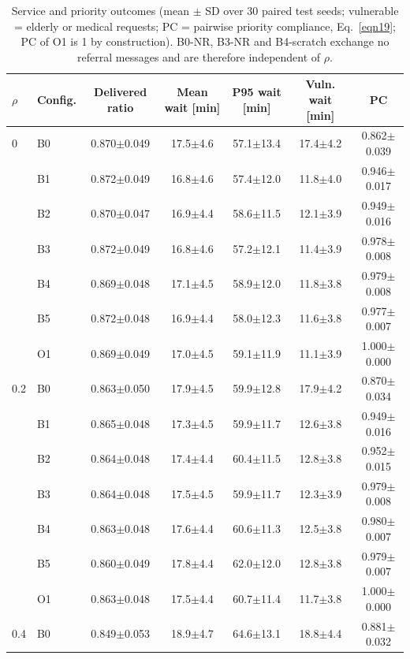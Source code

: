 \begin{table}[!t]
\caption{Service and priority outcomes (mean $\pm$ SD over 30 paired test seeds; vulnerable = elderly or medical requests; PC = pairwise priority compliance, Eq.~\eqref{eqn19}; PC of O1 is 1 by construction). B0-NR, B3-NR and B4-scratch exchange no referral messages and are therefore independent of $\rho$.}
\label{tabres}
\centering\footnotesize
\begin{tabular}{llccccc}
\toprule
$\rho$ & Config. & Delivered ratio & Mean wait [min] & P95 wait [min] & Vuln. wait [min] & PC \\
\midrule
0 & B0 & 0.870$\pm$0.049 & 17.5$\pm$4.6 & 57.1$\pm$13.4 & 17.4$\pm$4.2 & 0.862$\pm$0.039 \\
 & B1 & 0.872$\pm$0.049 & 16.8$\pm$4.6 & 57.4$\pm$12.0 & 11.8$\pm$4.0 & 0.946$\pm$0.017 \\
 & B2 & 0.870$\pm$0.047 & 16.9$\pm$4.4 & 58.6$\pm$11.5 & 12.1$\pm$3.9 & 0.949$\pm$0.016 \\
 & B3 & 0.872$\pm$0.049 & 16.8$\pm$4.6 & 57.2$\pm$12.1 & 11.4$\pm$3.9 & 0.978$\pm$0.008 \\
 & B4 & 0.869$\pm$0.048 & 17.1$\pm$4.5 & 58.9$\pm$12.0 & 11.8$\pm$3.8 & 0.979$\pm$0.008 \\
 & B5 & 0.872$\pm$0.048 & 16.9$\pm$4.4 & 58.0$\pm$12.3 & 11.6$\pm$3.8 & 0.977$\pm$0.007 \\
 & O1 & 0.869$\pm$0.049 & 17.0$\pm$4.5 & 59.1$\pm$11.9 & 11.1$\pm$3.9 & 1.000$\pm$0.000 \\
\midrule
0.2 & B0 & 0.863$\pm$0.050 & 17.9$\pm$4.5 & 59.9$\pm$12.8 & 17.9$\pm$4.2 & 0.870$\pm$0.034 \\
 & B1 & 0.865$\pm$0.048 & 17.3$\pm$4.5 & 59.9$\pm$11.7 & 12.6$\pm$3.8 & 0.949$\pm$0.016 \\
 & B2 & 0.864$\pm$0.048 & 17.4$\pm$4.4 & 60.4$\pm$11.5 & 12.8$\pm$3.8 & 0.952$\pm$0.015 \\
 & B3 & 0.864$\pm$0.048 & 17.5$\pm$4.5 & 59.9$\pm$11.7 & 12.3$\pm$3.9 & 0.979$\pm$0.008 \\
 & B4 & 0.863$\pm$0.048 & 17.6$\pm$4.4 & 60.6$\pm$11.3 & 12.5$\pm$3.8 & 0.980$\pm$0.007 \\
 & B5 & 0.860$\pm$0.049 & 17.8$\pm$4.4 & 62.0$\pm$12.0 & 12.8$\pm$3.8 & 0.979$\pm$0.007 \\
 & O1 & 0.863$\pm$0.048 & 17.5$\pm$4.4 & 60.7$\pm$11.4 & 11.7$\pm$3.8 & 1.000$\pm$0.000 \\
\midrule
0.4 & B0 & 0.849$\pm$0.053 & 18.9$\pm$4.7 & 64.6$\pm$13.1 & 18.8$\pm$4.4 & 0.881$\pm$0.032 \\

\end{tabular}
\end{table}
